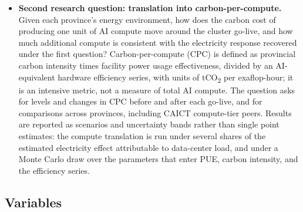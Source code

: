 \documentclass[12pt,a4paper]{article}
\begin{document}
\begin{itemize}
  \item \textbf{Second research question: translation into
        carbon-per-compute.} Given each province's energy environment,
        how does the carbon cost of producing one unit of AI compute
        move around the cluster go-live, and how much additional
        compute is consistent with the electricity response recovered
        under the first question? Carbon-per-compute (CPC) is defined
        as provincial carbon intensity times facility power usage
        effectiveness, divided by an AI-equivalent hardware efficiency
        series, with units of tCO\textsubscript{2} per exaflop-hour;
        it is an intensive metric, not a measure of total AI compute.
        The question asks for levels and changes in CPC before and
        after each go-live, and for comparisons across provinces,
        including CAICT compute-tier peers. Results are reported as
        scenarios and uncertainty bands rather than single point
        estimates: the compute translation is run under several shares
        of the estimated electricity effect attributable to
        data-center load, and under a Monte Carlo draw over the
        parameters that enter PUE, carbon intensity, and the
        efficiency series.
\end{itemize}


\subsection{Variables}
%
\end{document}
